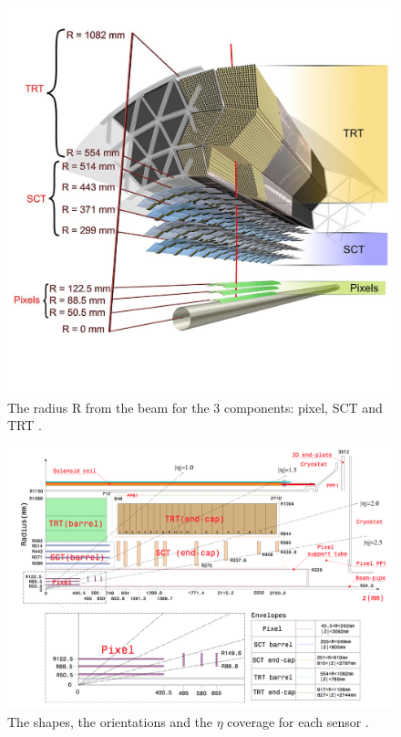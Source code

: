 \begin{figure}
\centering
\includegraphics[width=\textwidth]{data/photo/detector/inner_detail.jpg}
\caption{The radius R from the beam for the 3 components: pixel, SCT and TRT \cite{inner_photo}.}
\label{fig:detector_inner_detail}
\end{figure}
\begin{figure}
\centering
\includegraphics[width=\textwidth]{data/photo/detector/inner_size.png}
\caption{The shapes, the orientations and the $\eta$ coverage for each sensor \cite{ATLAS_doc}.}
\label{fig:detector_inner_size}
\end{figure}

